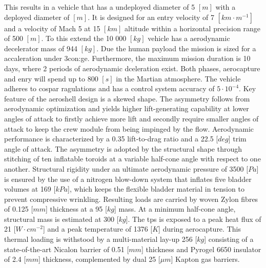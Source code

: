 This results in a vehicle that has a undeployed diameter of 5 $ \left[ m \right] $ with a deployed diameter of $ \left[ m \right] $. It is designed for an entry velocity of 7 $ \left[ km \cdot m^{-1} \right] $ and a velocity of Mach 5 at  15 $ \left[ km \right] $ altitude within a horizontal precision range of 500 $ \left[ m \right] $. To this extend the 10 000 $ \left[ kg \right] $ vehicle has a aerodynamic decelerator mass of 944 $ \left[ kg \right] $. Due the human payload the mission is sized for a accaleration under 3\gls{con:ge}. Furthermore, the maximum mission duration is 10 days, where 2 periods of aerodynamic dceleration exist. Both phases, aerocapture and enry will spend up to 800 $ \left[ s \right] $ in the Martian atmosphere. The vehicle adheres to \acrshort{cospar} ragulations and has a control system accuracy of $ 5 \cdot 10^{-4} $.
\newline
\newline
Key feature of the aeroshell design is a skewed shape. The asymmetry follows from aerodynamic optimization and yields higher lift-generating capability at lower angles of attack to firstly achieve more lift and secondly require smaller angles of attack to keep the crew module from being impinged by the flow. Aerodynamic performance is characterized by a 0.35 lift-to-drag ratio and a 22.5 [$deg$] trim angle of attack.
\newline
\newline
The asymmetry is adopted by the structural shape through stitching of ten inflatable toroids at a variable half-cone angle with respect to one another. Structural rigidity under an ultimate aerodynamic pressure of 3500 [$Pa$] is ensured by the use of a nitrogen blow-down system that inflates five bladder volumes at 169 [$kPa$], which keeps the flexible bladder material in tension to prevent compressive wrinkling. Resulting loads are carried by woven Zylon fibres of 0.125 [$mm$] thickness at a 95 [$kg$] mass. At a minimum half-cone angle,  structural mass is estimated at 300 [$kg$]. 
\newline
\newline
The \acrlong{tps} is exposed to a peak heat flux of 21 [$W \cdot cm^{-2}$] and a peak temperature of 1376 [$K$] during aerocapture. This thermal loading is withstood by a multi-material lay-up 256 [$kg$] consisting of a state-of-the-art Nicalon barrier of 0.51 [$mm$] thickness and Pyrogel 6650 insulator of 2.4 [$mm$] thickness, complemented by dual 25 [$\mu m$] Kapton gas barriers. 
\newline
